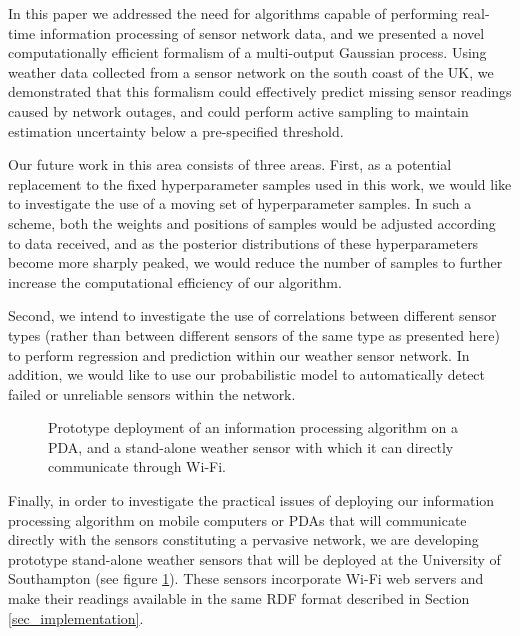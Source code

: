 \documentclass{acmtrans2m}
\begin{document}
\noindent In this paper we addressed the need for algorithms capable of performing real-time information processing of sensor network data, and we presented a novel computationally efficient formalism of a multi-output Gaussian process. Using weather data collected from a sensor network on the south coast of the UK, we demonstrated that this formalism could effectively predict missing sensor readings caused by network outages, and could perform active sampling to maintain estimation uncertainty below a pre-specified threshold.

Our future work in this area consists of three areas. First, as a potential replacement to the fixed hyperparameter samples used in this work, we would like to investigate the use of a moving set of hyperparameter samples. In such a scheme, both the weights and positions of samples would be adjusted according to data received, and as the posterior distributions of these hyperparameters become more sharply peaked, we would reduce the number of samples to further increase the computational efficiency of our algorithm.

Second, we intend to investigate the use of correlations between different sensor types (rather than between different sensors of the same type as presented here) to perform regression and prediction within our weather sensor network. In addition, we would like to use our probabilistic model to automatically detect failed or unreliable sensors within the network. 

\begin{figure}
\begin{center}
\hspace{1.0cm}
\caption{Prototype deployment of an information processing algorithm on a PDA, and a stand-alone weather sensor with which it can directly communicate through Wi-Fi.}
\label{trimble}
\end{center}
\end{figure}

Finally, in order to investigate the practical issues of deploying our information processing algorithm on mobile computers or PDAs that will communicate directly with the sensors constituting a pervasive network, we are developing prototype stand-alone weather sensors that will be deployed at the University of Southampton (see figure \ref{trimble}). These sensors incorporate Wi-Fi web servers and make their readings available in the same RDF format described in Section \ref{sec_implementation}.
\end{document}
